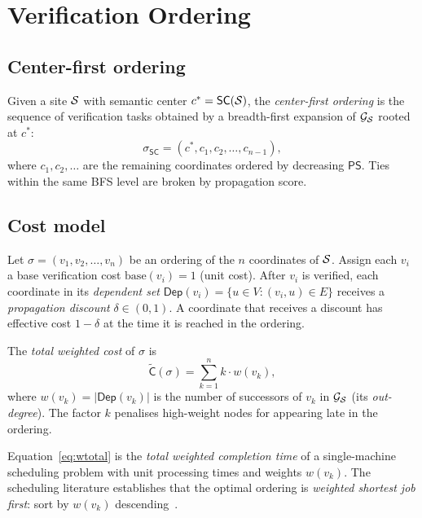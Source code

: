 \documentclass[11pt]{article}
\newcommand{\SC}{\mathsf{SC}}               %
\newcommand{\MG}{\mathcal{G}_{\Site}}       %
\newcommand{\PropScore}{\mathsf{PS}}        %
\newcommand{\VerCost}{\mathsf{C}}           %
\newcommand{\DepSet}{\mathsf{Dep}}          %
\newcommand{\wtotal}{\widetilde{\VerCost}}  %
\newcommand{\anyord}{\sigma}                %
\newcommand{\wt}{w}                         %
\begin{document}
\section{Verification Ordering}\label{sec:ordering}

\subsection{Center-first ordering}

Given a site $\mathcal{S}$ with semantic center $c^* = \SC(\Site)$, the
\emph{center-first ordering} is the sequence of verification tasks
obtained by a breadth-first expansion of $\MG$ rooted at $c^*$:
\[
  \anyord_{\SC} = (c^*, c_1, c_2, \ldots, c_{n-1}),
\]
where $c_1, c_2, \ldots$ are the remaining coordinates ordered by
decreasing $\PropScore$.  Ties within the same BFS level are broken by
propagation score.

\subsection{Cost model}

\begin{definition}\label{def:ver-cost}
Let $\anyord = (v_1, v_2, \ldots, v_n)$ be an ordering of the $n$
coordinates of $\mathcal{S}$.  Assign each $v_i$ a base verification cost
$\mathrm{base}(v_i) = 1$ (unit cost).  After $v_i$ is verified, each
coordinate in its \emph{dependent set} $\DepSet(v_i)
= \{u \in V : (v_i, u) \in E\}$ receives a \emph{propagation discount}
$\delta \in (0,1)$.  A coordinate that receives a discount has effective
cost $1 - \delta$ at the time it is reached in the ordering.

The \emph{total weighted cost} of $\anyord$ is
\begin{equation}\label{eq:wtotal}
  \wtotal(\anyord) = \sum_{k=1}^{n} k \cdot \wt(v_k),
\end{equation}
where $\wt(v_k) = |\DepSet(v_k)|$ is the number of successors of $v_k$
in $\MG$ (its \emph{out-degree}).  The factor $k$ penalises high-weight
nodes for appearing late in the ordering.
\end{definition}

\begin{remark}
Equation~\eqref{eq:wtotal} is the \emph{total weighted completion time}
of a single-machine scheduling problem with unit processing times and
weights $\wt(v_k)$.  The scheduling literature establishes that
the optimal ordering is \emph{weighted shortest job first}: sort by
$\wt(v_k)$ descending~\cite{Conway1967}.
\end{remark}
\end{document}
